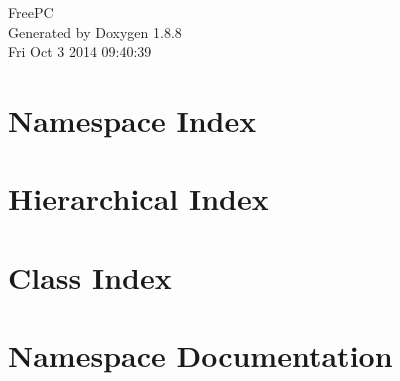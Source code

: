 \documentclass[twoside]{book}
\newcommand{\+}{\discretionary{\mbox{\scriptsize$\hookleftarrow$}}{}{}}
\newcommand{\clearemptydoublepage}{%
  \newpage{\pagestyle{empty}\cleardoublepage}%
}
\begin{document}
\hypersetup{pageanchor=false,
             bookmarks=true,
             bookmarksnumbered=true,
             pdfencoding=unicode
            }
\begin{titlepage}
\vspace*{7cm}
\begin{center}%
{\Large Free\+P\+C }\\
\vspace*{1cm}
{\large Generated by Doxygen 1.8.8}\\
\vspace*{0.5cm}
{\small Fri Oct 3 2014 09:40:39}\\
\end{center}
\end{titlepage}
\clearemptydoublepage
\tableofcontents
\clearemptydoublepage
{}
\hypersetup{pageanchor=true}

\chapter{Namespace Index}

\chapter{Hierarchical Index}

\chapter{Class Index}

\chapter{Namespace Documentation}






\end{document}
